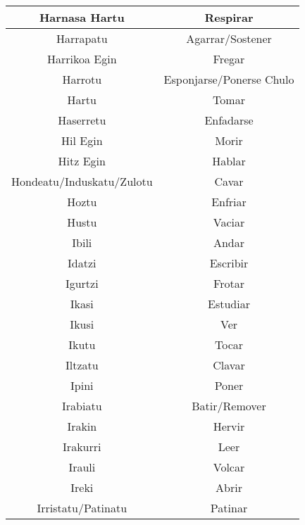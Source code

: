 \documentclass[11pt, a4paper]{article}
\begin{document}
\begin{longtable}{cc}
\hline
Harnasa Hartu              & Respirar                    \\ 
\hline
Harrapatu                  & Agarrar/Sostener            \\ 
\hline
Harrikoa Egin              & Fregar                      \\ 
\hline
Harrotu                    & Esponjarse/Ponerse Chulo    \\ 
\hline
Hartu                      & Tomar                       \\ 
\hline
Haserretu                  & Enfadarse                   \\ 
\hline
Hil Egin                   & Morir                       \\ 
\hline
Hitz Egin                  & Hablar                      \\ 
\hline
Hondeatu/Induskatu/Zulotu  & Cavar                       \\ 
\hline
Hoztu                      & Enfriar                     \\ 
\hline
Hustu                      & Vaciar                      \\ 
\hline
Ibili                      & Andar                       \\ 
\hline
Idatzi                     & Escribir                    \\ 
\hline
Igurtzi                    & Frotar                      \\ 
\hline
Ikasi                      & Estudiar                    \\ 
\hline
Ikusi                      & Ver                         \\ 
\hline
Ikutu                      & Tocar                       \\ 
\hline
Iltzatu                    & Clavar                      \\ 
\hline
Ipini                      & Poner                       \\ 
\hline
Irabiatu                   & Batir/Remover               \\ 
\hline
Irakin                     & Hervir                      \\ 
\hline
Irakurri                   & Leer                        \\ 
\hline
Irauli                     & Volcar                      \\ 
\hline
Ireki                      & Abrir                       \\ 
\hline
Irristatu/Patinatu         & Patinar                     \\ 

\end{longtable}
\end{document}
